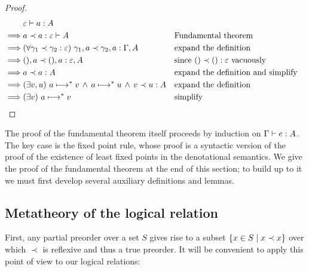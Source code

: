 \begin{proof}
\begin{align*}
  & \J{a}{\emptycx}{A}
  \\
  \implies& \oplr{\emptycx \vdash A} a a
  && \text{Fundamental theorem}
  \\
  \implies& \fa{\oplr{\emptycx}{\gamma_1}{\gamma_2}}
  \oplr{\Gamma,A}{\gamma_1,a}{\gamma_2,a}
  && \text{expand the definition}
  \\
  \implies& \oplr{\emptycx,A}{\tuple{},a}{\tuple{},a}
  && \text{since }\oplr{\emptycx}{\tuple{}}{\tuple{}}\text{ vacuously}
  \\
  \implies& \oplrclosed{A} a a
  && \text{expand the definition and simplify}
  \\
  \implies& \ex{v,u} a \evalsto v \wedge a \evalsto u \wedge \oplrvalue A v u
  && \text{expand the definition}
  \\
  \implies& \ex{v} a \evalsto v
  && \text{simplify}
\end{align*}
\end{proof}

\noindent
The proof of the fundamental theorem itself proceeds by induction on ${\Gamma} \vdash {e} \mathrel{:} {A}$.
%
The key case is the fixed point rule, whose proof is a syntactic version of
the proof of the existence of least fixed points in the denotational semantics.
%
%
We give the proof of the fundamental theorem at the end of this section; to
build up to it we must first develop several auxiliary definitions and lemmas.


\subsection{Metatheory of the logical relation}


\newcommand\goodvalue[1]{\ensuremath{\textsf{Ok}_{\textsf{V}}({#1})}}
\newcommand\goodclosed[1]{\ensuremath{\textsf{Ok}_{\textsf{C}}({#1})}}
\newcommand\goodopen[1]{\ensuremath{\textsf{Ok}({#1})}}

First, any partial preorder over a set $S$ gives rise to a subset $\{x \in S \mathrel{|} x \prec x\}$ over which $\prec$ is reflexive and thus a true preorder. It will be convenient to apply this point of view to our logical relations:

